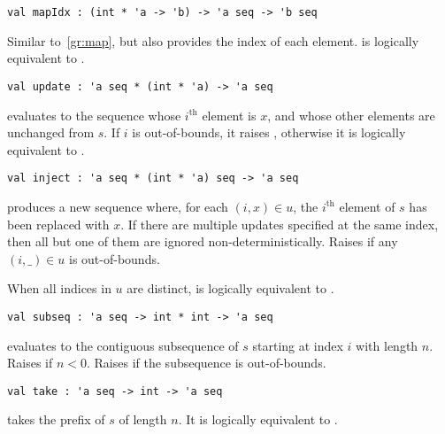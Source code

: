 \begin{gram}[mapIdx]
\label{gr:mapIdx}
\begin{verbatim}
val mapIdx : (int * 'a -> 'b) -> 'a seq -> 'b seq
\end{verbatim}
Similar to~\ref{gr:map}, but also provides the index of each element.
 is logically equivalent to .
\end{gram}

\begin{gram}[update]
\label{gr:update}
\begin{verbatim}
val update : 'a seq * (int * 'a) -> 'a seq
\end{verbatim}
 evaluates to the sequence whose $i^\text{th}$ element
is $x$, and whose other elements are unchanged from $s$. If $i$ is out-of-bounds,
it raises , otherwise it is logically equivalent to
.
\end{gram}

\begin{flex}
\begin{gram}[inject]
\label{gr:inject}
\begin{verbatim}
val inject : 'a seq * (int * 'a) seq -> 'a seq
\end{verbatim}
 produces a new sequence where, for each $(i,x) \in u$,
the $i^\text{th}$ element of $s$ has been replaced with $x$. If there are
multiple updates specified
at the same index, then all but one of them are ignored non-deterministically.
Raises  if any $(i,\_) \in u$ is out-of-bounds.
\end{gram}
\begin{note}
When all indices in $u$ are distinct,  is logically
equivalent to .
\end{note}
\end{flex}

\begin{gram}[subseq]
\label{gr:subseq}
\begin{verbatim}
val subseq : 'a seq -> int * int -> 'a seq
\end{verbatim}
 evaluates to the contiguous subsequence of $s$ starting
at index $i$ with length $n$. Raises  if $n < 0$. Raises 
if the subsequence is out-of-bounds.
\end{gram}

\begin{gram}[take]
\label{gr:take}
\begin{verbatim}
val take : 'a seq -> int -> 'a seq
\end{verbatim}
 takes the prefix of $s$ of length $n$. It is logically
equivalent to .
\end{gram}

